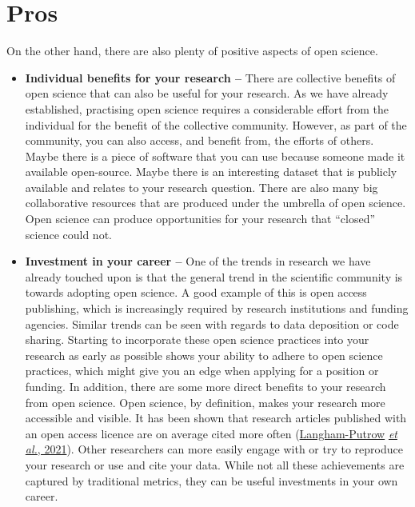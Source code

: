 \documentclass[
]{book}
\begin{document}
\hypertarget{pros}{%
\section{Pros}\label{pros}}

On the other hand, there are also plenty of positive aspects of open science.

\begin{itemize}
\item
  \textbf{Individual benefits for your research --} There are collective benefits of open science that can also be useful for your research. As we have already established, practising open science requires a considerable effort from the individual for the benefit of the collective community. However, as part of the community, you can also access, and benefit from, the efforts of others. Maybe there is a piece of software that you can use because someone made it available open-source. Maybe there is an interesting dataset that is publicly available and relates to your research question. There are also many big collaborative resources that are produced under the umbrella of open science. Open science can produce opportunities for your research that ``closed'' science could not.
\item
  \textbf{Investment in your career --} One of the trends in research we have already touched upon is that the general trend in the scientific community is towards adopting open science. A good example of this is open access publishing, which is increasingly required by research institutions and funding agencies. Similar trends can be seen with regards to data deposition or code sharing. Starting to incorporate these open science practices into your research as early as possible shows your ability to adhere to open science practices, which might give you an edge when applying for a position or funding. In addition, there are some more direct benefits to your research from open science. Open science, by definition, makes your research more accessible and visible. It has been shown that research articles published with an open access licence are on average cited more often (\href{https://journals.plos.org/plosone/article?id=10.1371/journal.pone.0253129}{Langham-Putrow} \href{https://journals.plos.org/plosone/article?id=10.1371/journal.pone.0253129}{\emph{et al.}, 2021}). Other researchers can more easily engage with or try to reproduce your research or use and cite your data. While not all these achievements are captured by traditional metrics, they can be useful investments in your own career.

\end{itemize}
\end{document}
